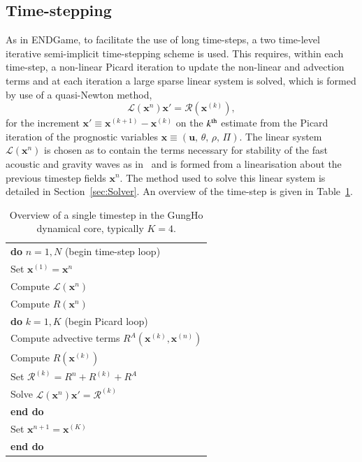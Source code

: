 \documentclass[review,times]{elsarticle}
\providecommand{\tabularnewline}{\\}
\begin{document}
\subsection{Time-stepping\label{sec:sub:timestepping}}

As in ENDGame, to facilitate the use of long time-steps, a two time-level 
iterative semi-implicit time-stepping scheme is used. This requires, within each 
time-step, a non-linear Picard iteration to update the non-linear and advection terms 
and at each iteration a large sparse linear system is solved, which is formed by 
use of a quasi-Newton method,
%
\begin{equation}
\mathcal{L}\left(\mathbf{x}^n\right)\mathbf{x}' = \mathcal{R}\left(\mathbf{x}^{(k)}\right),\label{eq:quasi-newton}
\end{equation}
%
for the increment $\mathbf{x}'\equiv\mathbf{x}^{(k+1)}-\mathbf{x}^{(k)}$ on the $k^{\rm{th}}$ 
estimate from the Picard iteration of the prognostic variables $\mathbf{x}\equiv\left(\mathbf{u},\,\theta,\,\rho,\,\Pi\right)$. 
The linear system $\mathcal{L}\left(\mathbf{x}^n\right)$ is chosen as to contain the terms necessary for stability of 
the fast acoustic and gravity waves as in~\cite{QJ:QJ2235} and is formed from a linearisation about the previous 
timestep fields $\mathbf{x}^n$. The method used to solve this linear system is detailed in Section~\ref{sec:Solver}. 
An overview of the time-step is given in Table~\ref{tab:timestep}.
%
\begin{table}
\begin{centering}
\begin{tabular}{l}
\hline 
\textbf{do} $n=1,N$ (begin time-step loop)\tabularnewline
\hspace{0.5cm}Set $\mathbf{x}^{(1)} = \mathbf{x}^n$\tabularnewline
\hspace{0.5cm}Compute $\mathcal{L}\left(\mathbf{x}^n\right)$\tabularnewline
\hspace{0.5cm}Compute $R\left(\mathbf{x}^n\right)$\tabularnewline
\hspace{0.5cm}\textbf{do} $k=1,K$ (begin Picard loop)\tabularnewline
\hspace{1.0cm}Compute advective terms $R^A\left(\mathbf{x}^{(k)},\mathbf{x}^{(n)}\right)$\tabularnewline
\hspace{1.0cm}Compute $R\left(\mathbf{x}^{(k)}\right)$\tabularnewline
\hspace{1.0cm}Set $\mathcal{R}^{(k)} = R^n + R^{(k)} + R^A$\tabularnewline

\hspace{1.0cm}Solve $\mathcal{L}\left(\mathbf{x}^n\right)\mathbf{x}' = \mathcal{R}^{(k)}$\tabularnewline
\hspace{0.5cm}\textbf{end do}\tabularnewline
\hspace{0.5cm}Set $\mathbf{x}^{n+1} = \mathbf{x}^{(K)}$\tabularnewline
\textbf{end do}\tabularnewline
\hline
\end{tabular}
\end{centering}
\caption{\label{tab:timestep}Overview of a single timestep in the GungHo dynamical core, typically $K=4$.}
\end{table}
%
\end{document}

